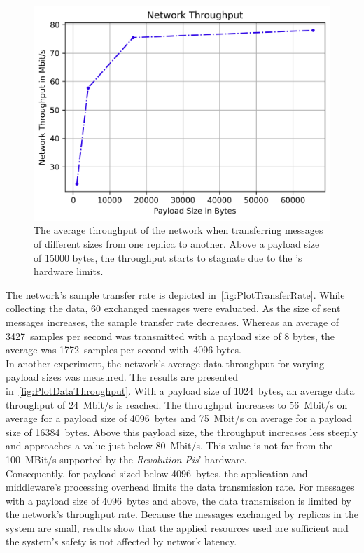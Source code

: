 \begin{figure}[!htb]
	\centering
	\includegraphics[width=0.8\linewidth]{images/plots/dataThroughput}
	\caption{The average throughput of the network when transferring messages of different sizes from one replica to another. Above a payload size of 15000 bytes, the throughput starts to stagnate due to the 's hardware limits.}
	\label{fig:PlotDataThroughput}
\end{figure}

The network's sample transfer rate is depicted in~\autoref{fig:PlotTransferRate}.
While collecting the data, 60 exchanged messages were evaluated.
As the size of sent messages increases, the sample transfer rate decreases.
Whereas an average of 3427~samples per second was transmitted with a payload size of 8 bytes, the average was 1772~samples per second with~4096 bytes.
\\

In another experiment, the network's average data throughput for varying payload sizes was measured.
The results are presented in~\autoref{fig:PlotDataThroughput}.
With a payload size of 1024~bytes, an average data throughput of 24~Mbit/s is reached.
The throughput increases to 56~Mbit/s on average for a payload size of 4096~bytes and 75~Mbit/s on average for a payload size of 16384~bytes.
Above this payload size, the throughput increases less steeply and approaches a value just below 80~Mbit/s.
This value is not far from the 100~MBit/s supported by the \textit{Revolution Pis}' hardware.
\\

Consequently, for payload sized below 4096~bytes, the application and middleware's processing overhead limits the data transmission rate.
For messages with a payload size of 4096~bytes and above, the data transmission is limited by the network's throughput rate.
Because the messages exchanged by replicas in the system are small, results show that the applied resources used are sufficient and the system's safety is not affected by network latency.
\\

